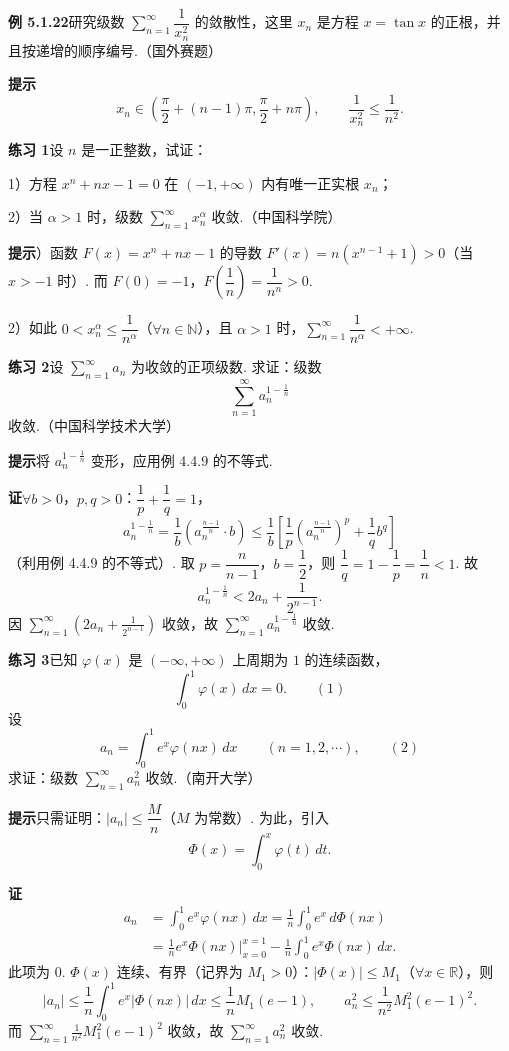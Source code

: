 \documentclass[UTF8,12pt,a4paper,fontset=fandol]{ctexart}
\begin{document}
\noindent\textbf{例 5.1.22}\quad 研究级数 $\displaystyle\sum_{n=1}^\infty\dfrac1{x_n^2}$ 的敛散性，这里 $x_n$ 是方程 $x=\tan x$ 的正根，并且按递增的顺序编号.（国外赛题）

\noindent\textbf{提示}\quad
\[
  x_n\in\left(\frac\pi2+(n-1)\pi,\frac\pi2+n\pi\right),\qquad
  \frac1{x_n^2}\le\frac1{n^2}.
\]

\noindent\textbf{练习 1}\quad 设 $n$ 是一正整数，试证：

1）方程 $x^n+nx-1=0$ 在 $(-1,+\infty)$ 内有唯一正实根 $x_n$；

2）当 $\alpha>1$ 时，级数 $\displaystyle\sum_{n=1}^\infty x_n^\alpha$ 收敛.（中国科学院）

\noindent\textbf{提示}）函数 $F(x)=x^n+nx-1$ 的导数 $F'(x)=n(x^{n-1}+1)>0$（当 $x>-1$ 时）. 而 $F(0)=-1$，$F\left(\dfrac1n\right)=\dfrac1{n^n}>0$.

2）如此 $0<x_n^\alpha\le\dfrac1{n^\alpha}$（$\forall n\in\mathbb{N}$），且 $\alpha>1$ 时，$\displaystyle\sum_{n=1}^\infty\dfrac1{n^\alpha}<+\infty$.

\noindent\textbf{练习 2}\quad 设 $\displaystyle\sum_{n=1}^\infty a_n$ 为收敛的正项级数. 求证：级数
\[
  \sum_{n=1}^\infty a_n^{1-\frac1n}
\]
收敛.（中国科学技术大学）

\noindent\textbf{提示}\quad 将 $a_n^{1-\frac1n}$ 变形，应用例 4.4.9 的不等式.

\noindent\textbf{证}\quad $\forall b>0$，$p,q>0$：$\dfrac1p+\dfrac1q=1$，
\[
  a_n^{1-\frac1n}=\frac1b(a_n^{\frac{n-1}n}\cdot b)
  \le\frac1b\left[\frac1p(a_n^{\frac{n-1}n})^p+\frac1q b^q\right]
\]
（利用例 4.4.9 的不等式）. 取 $p=\dfrac n{n-1}$，$b=\dfrac12$，则 $\dfrac1q=1-\dfrac1p=\dfrac1n<1$. 故
\[
  a_n^{1-\frac1n}<2a_n+\frac1{2^{n-1}}.
\]
因 $\displaystyle\sum_{n=1}^\infty\left(2a_n+\frac1{2^{n-1}}\right)$ 收敛，故 $\displaystyle\sum_{n=1}^\infty a_n^{1-\frac1n}$ 收敛.

\noindent\textbf{练习 3}\quad 已知 $\varphi(x)$ 是 $(-\infty,+\infty)$ 上周期为 $1$ 的连续函数，
\[
  \int_0^1\varphi(x)\,dx=0.
\qquad(1)
\]
设
\[
  a_n=\int_0^1 e^x\varphi(nx)\,dx\qquad(n=1,2,\cdots),
\qquad(2)
\]
求证：级数 $\displaystyle\sum_{n=1}^\infty a_n^2$ 收敛.（南开大学）

\noindent\textbf{提示}\quad 只需证明：$|a_n|\le\dfrac Mn$（$M$ 为常数）. 为此，引入
\[
  \Phi(x)=\int_0^x\varphi(t)\,dt.
\]

\noindent\textbf{证}\quad
\[
\begin{aligned}
a_n
&=\int_0^1 e^x\varphi(nx)\,dx
=\frac1n\int_0^1 e^x\,d\Phi(nx)\\
&=\frac1n e^x\Phi(nx)\bigg|_{x=0}^{x=1}
  -\frac1n\int_0^1 e^x\Phi(nx)\,dx.
\end{aligned}
\]
此项为 $0$. $\Phi(x)$ 连续、有界（记界为 $M_1>0$）：$|\Phi(x)|\le M_1$（$\forall x\in\mathbb{R}$），则
\[
  |a_n|\le\frac1n\int_0^1e^x|\Phi(nx)|\,dx
  \le\frac1nM_1(e-1),
\qquad
  a_n^2\le\frac1{n^2}M_1^2(e-1)^2.
\]
而 $\displaystyle\sum_{n=1}^\infty\frac1{n^2}M_1^2(e-1)^2$ 收敛，故 $\displaystyle\sum_{n=1}^\infty a_n^2$ 收敛.
\end{document}
